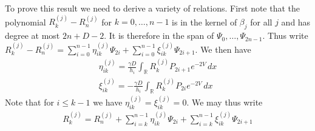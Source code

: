 \documentclass[12pt]{article}
\theoremstyle{definition}
\begin{document}
To prove this result we need to derive a variety of relations. First note that the polynomial $R_k^{(j)}- R_n^{(j)}$ for $k=0, \dots, n-1$ is in the kernel of $\beta_j$ for all $j$ and has degree at most $2n+D-2$.  It is therefore in the span of $\Psi_0 , \dots, \Psi_{2n-1}$. Thus write
$R_k^{(j)}- R_n^{(j)} = \sum_{i=0}^{n-1} \eta_{ik}^{(j)} \Psi_{2i}+\sum_{i=0}^{n-1} \xi_{ik}^{(j)} \Psi_{2i+1}$. We then have
\begin{align*}
\eta_{ik}^{(j)} = \frac{\gamma D}{h_i}\int_\mathbb{R} R_k^{(j)} P_{2i+1} e^{-2V} \, dx \\
\xi_{ik}^{(j)} = - \frac{\gamma D}{h_i} \int_\mathbb{R} R_k^{(j)} P_{2i} e^{-2V} \, dx
\end{align*}
Note that for $i \leq k-1$ we have $\eta_{ik}^{(j)} = \xi_{ik}^{(j)}  = 0$. We may thus write
\begin{align}
R_k^{(j)} = R_n^{(j)}+ \sum_{i=k}^{n-1} \eta_{ik}^{(j)} \Psi_{2i}+\sum_{i=k}^{n-1} \xi_{ik}^{(j)} \Psi_{2i+1}
\end{align}
\end{document}
